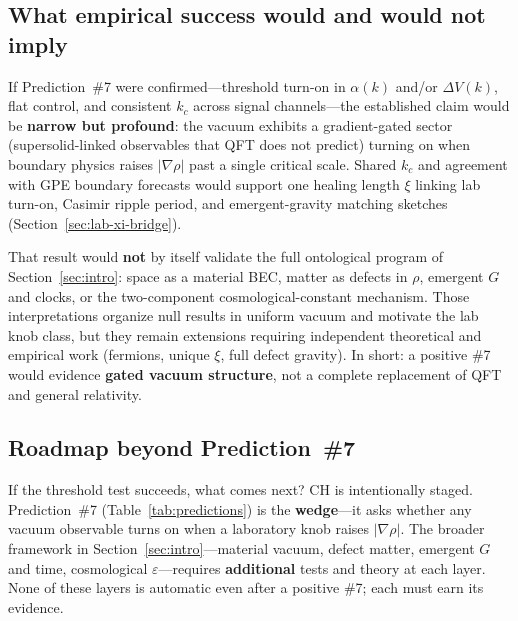 \documentclass[11pt,a4paper]{article}
\begin{document}
\subsection{What empirical success would and would not imply}
\label{sec:implications}

If Prediction~\#7 were confirmed---threshold turn-on in $\alpha(k)$ and/or $\Delta V(k)$, flat control, and consistent $k_c$ across signal channels---the established claim would be \textbf{narrow but profound}: the vacuum exhibits a gradient-gated sector (supersolid-linked observables that QFT does not predict) turning on when boundary physics raises $|\nabla\rho|$ past a single critical scale.
Shared $k_c$ and agreement with GPE boundary forecasts would support one healing length $\xi$ linking lab turn-on, Casimir ripple period, and emergent-gravity matching sketches (Section~\ref{sec:lab-xi-bridge}).

That result would \textbf{not} by itself validate the full ontological program of Section~\ref{sec:intro}: space as a material BEC, matter as defects in $\rho$, emergent $G$ and clocks, or the two-component cosmological-constant mechanism.
Those interpretations organize null results in uniform vacuum and motivate the lab knob class, but they remain extensions requiring independent theoretical and empirical work (fermions, unique $\xi$, full defect gravity).
In short: a positive \#7 would evidence \textbf{gated vacuum structure}, not a complete replacement of QFT and general relativity.

\subsection{Roadmap beyond Prediction~\#7}
\label{sec:roadmap}

If the threshold test succeeds, what comes next?
CH is intentionally staged.
Prediction~\#7 (Table~\ref{tab:predictions}) is the \textbf{wedge}---it asks whether any vacuum observable turns on when a laboratory knob raises $|\nabla\rho|$.
The broader framework in Section~\ref{sec:intro}---material vacuum, defect matter, emergent $G$ and time, cosmological $\varepsilon$---requires \textbf{additional} tests and theory at each layer.
None of these layers is automatic even after a positive \#7; each must earn its evidence.
\end{document}
